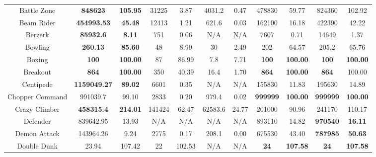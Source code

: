 \documentclass[nohyperref]{article}
\newcommand{\best}[1]{\textbf{#1}}
\theoremstyle{plain}
\begin{document}
\begin{table}[!hb]
\begin{center}
\begin{tabular}{| c |c c| c c| c c| c c| c c| }
 Battle Zone        & \textbf{848623         }& \textbf{105.95}      &31225      & 3.87     &4031.2    & 0.47       & 478830      &  59.77      &824360            &102.92     \\
 Beam Rider         & \textbf{454993.53}      & \textbf{45.48}      &12413      & 1.21     &621.6     & 0.03    & 162100      &  16.18          &422390            &42.22 \\
 Berzerk            & \textbf{85932.6        }& \textbf{8.11}      &751        & 0.06     &N/A       & N/A     & 7607        &  0.71            &14649             &1.37 \\
 Bowling            & \textbf{260.13         }& \textbf{85.60}      &48         & 8.99     &30        & 2.49    & 202         &  64.57          &205.2             &65.76   \\
 Boxing             & \textbf{100}                     & \textbf{100.00}       &87                  & 86.99       &7.8         & 7.71       & \best{100}  & \best{100.00 } &\textbf{100}               &\textbf{100.00} \\
 Breakout           & \textbf{864}                     & \textbf{100.00}          &350                 & 40.39       &16.4     & 1.70       & \best{864}  & \best{100.00}  &\textbf{864}             &100.00 \\
 Centipede          & \textbf{1159049.27}     & \textbf{89.02}     &6601       & 0.35     &N/A       & N/A     & 155830      & 11.83                     &195630            &14.89\\
 Chopper Command    & 991039.7                & 99.10     &2833                & 0.20     & 979.4             & 0.02    & \best{999999}        & \best{100.00} &\textbf{999999}            &\textbf{100.00}  \\
 Crazy Climber      & \textbf{458315.4}       & \textbf{214.01    }  &141424     & 62.47       & 62583.6  & 24.77   & 201000      & 90.96                      &241170            &110.17 \\
 Defender           & 839642.95               & 13.93      & N/A                & N/A        & N/A               & N/A      & 893110 & 14.82 &\textbf{970540}            &\textbf{16.11}   \\
 Demon Attack       & 143964.26               & 9.24      & 2775              &0.17      & 208.1             & 0.00    & 675530      & 43.40  &\textbf{787985}   &\textbf{50.63} \\
 Double Dunk        & 23.94          & 107.42  & 22        &102.53        & N/A      & N/A     & \textbf{24}          & \textbf{107.58}                    &\textbf{24}                &\textbf{107.58}    \\

\end{tabular}
\end{center}
\end{table}
\end{document}
